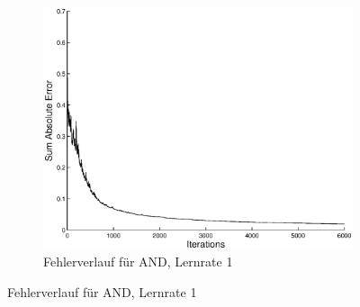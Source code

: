 \documentclass{article}
\begin{document}
	\begin{figure}[H]
	  \begin{subfigure}
	    \centering
	    \includegraphics[scale=0.75]{task1-and-error-6k.eps}
      \caption{Fehlerverlauf für AND, Lernrate 1}
	  \end{subfigure}
	\end{figure}
\end{document}

